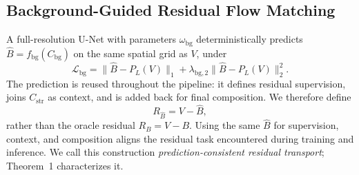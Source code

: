 \subsection{Background-Guided Residual Flow Matching}
A full-resolution U-Net \cite{ronneberger2015unet} with parameters $\omega_{\mathrm{bg}}$ deterministically predicts $\hat B=f_{\mathrm{bg}}(C_{\mathrm{bg}})$ on the same spatial grid as $V$, under
\begin{equation}
\mathcal L_{\mathrm{bg}}
=
\|\hat B-P_L(V)\|_1+\lambda_{\mathrm{bg},2}\|\hat B-P_L(V)\|_2^2.
\label{eq:background-loss}
\end{equation}
The prediction is reused throughout the pipeline: it defines residual supervision, joins $C_{\mathrm{str}}$ as context, and is added back for final composition. We therefore define
\begin{equation}
R_{\hat B}=V-\hat B,
\label{eq:prediction-consistent-residual}
\end{equation}
rather than the oracle residual $R_B=V-B$. Using the same $\hat B$ for supervision, context, and composition aligns the residual task encountered during training and inference. We call this construction \emph{prediction-consistent residual transport}; Theorem~1 characterizes it.


